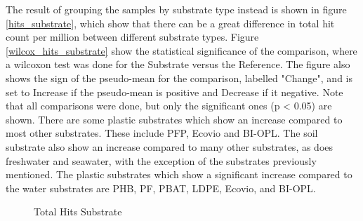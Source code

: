 The result of grouping the samples by substrate type instead is shown in figure \ref{hits_substrate}, which show that there can be a great difference in total hit count per million between different substrate types. 
Figure \ref{wilcox_hits_substrate} show the statistical significance of the comparison, where a wilcoxon test was done for the Substrate versus the Reference. The figure also shows the sign of the pseudo-mean for the comparison, labelled "Change", and is set to Increase if the pseudo-mean is positive and Decrease if it negative.
Note that all comparisons were done, but only the significant ones (p < 0.05) are shown.
There are some plastic substrates which show an increase compared to most other substrates. These include PFP, Ecovio and BI-OPL. 
The soil substrate also show an increase compared to many other substrates, as does freshwater and seawater, with the exception of the substrates previously mentioned. 
The plastic substrates which show a significant increase compared to the water substrates are PHB, PF, PBAT, LDPE, Ecovio, and BI-OPL. 


\begin{figure}[h]
    \centering
    \caption{Total Hits Substrate}
    \label{both_hits_substrate}
\end{figure}


